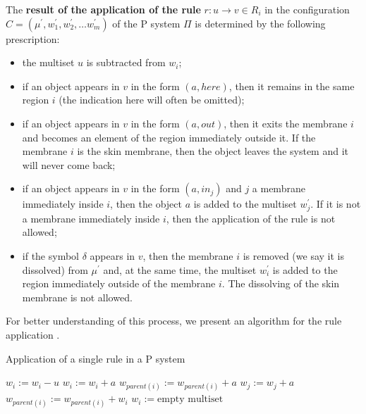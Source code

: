 \begin{definition}
  The {\bf result of the application of the rule} $r: u\rightarrow v\in R_i$ in the configuration $C = (\mu^\prime, w^\prime_1,w^\prime_2,\ldots w^\prime_m)$ of the P system $\Pi$ is determined by the following prescription:
  \begin{itemize}
    \item the multiset $u$ is subtracted from $w_i$;
    \item if an object appears in $v$ in the form $(a, here)$, then it remains in the same region $i$ (the indication here will often be omitted);
    \item if an object appears in $v$ in the form $(a, out)$, then it exits the membrane $i$ and becomes an element of the region immediately outside it. If the membrane $i$ is the skin membrane, then the object leaves the system and it will never come back;
    \item if an object appears in $v$ in the form $(a,in_j)$ and $j$ a membrane immediately inside $i$, then the object $a$ is added to the multiset $w^\prime_j$. If it is not a membrane immediately inside $i$, then the application of the rule is not allowed;
    \item if the symbol $\delta$ appears in $v$, then the membrane $i$ is removed (we say it is dissolved) from $\mu^\prime$ and, at the same time, the multiset $w^\prime_i$ is added to the region immediately outside of the membrane $i$. The dissolving of the skin membrane is not allowed.
  \end{itemize}
\end{definition}

For better understanding of this process, we present an algorithm for the rule application .

\begin{algorithm}
  \caption{Application of a single rule in a P system}\label{alg:application_of_a_rule_in_a_p_system}
  \begin{algorithmic}[1]
      \State $w_i := w_i - u$
        \State $w_i := w_i + a$
      \EndFor
        \State $w_{parent(i)} := w_{parent(i)} + a$
      \EndFor
        \State $w_j := w_j + a$
      \EndFor
        \State $w_{parent(i)} := w_{parent(i)} + w_i$
        \State $w_i := \text{empty multiset}$
      \EndIf
    \EndProcedure
  \end{algorithmic}
\end{algorithm}

